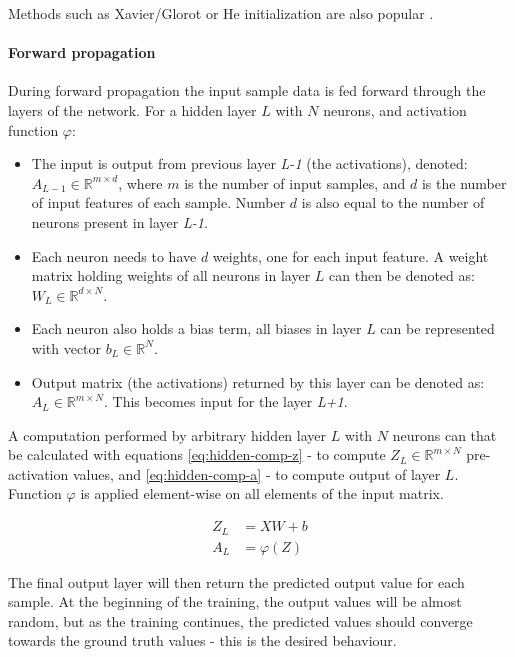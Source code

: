 Methods such as Xavier/Glorot or He initialization are also popular \cite{Abdullahi2023}.

\paragraph{Forward propagation}
During forward propagation the input sample data is fed forward through the layers of the network. For a hidden layer $L$ with $N$ neurons, and activation function $\varphi$:

\begin{itemize}
    \item The input is output from previous layer \textit{L-1} (the activations), denoted: $A_{L-1} \in \mathbb{R}^{m \times d}$, where $m$ is the number of input samples, and $d$ is the number of input features of each sample. Number $d$ is also equal to the number of neurons present in layer \textit{L-1}.
    \item Each neuron needs to have $d$ weights, one for each input feature. A weight matrix holding weights of all neurons in layer $L$ can then be denoted as: $W_L \in \mathbb{R}^{d \times N}$.
    \item Each neuron also holds a bias term, all biases in layer $L$ can be represented with vector $b_L \in \mathbb{R}^N$.
    \item Output matrix (the activations) returned by this layer can be denoted as: $A_L \in \mathbb{R}^{m \times N}$. This becomes input for the layer \textit{L+1}.
\end{itemize}

A computation performed by arbitrary hidden layer $L$ with $N$ neurons can that be calculated with equations \ref{eq:hidden-comp-z} - to compute $Z_L \in \mathbb{R}^{m \times N}$ pre-activation values, and \ref{eq:hidden-comp-a} - to compute output of layer $L$. Function $\varphi$ is applied element-wise on all elements of the input matrix.

\begin{align}
\label{eq:hidden-comp-z}
Z_L &= XW + b \\
\label{eq:hidden-comp-a}
A_L &= \varphi(Z)
\end{align}



The final output layer will then return the predicted output value for each sample. At the beginning of the training, the output values will be almost random, but as the training continues, the predicted values should converge towards the ground truth values - this is the desired behaviour.

